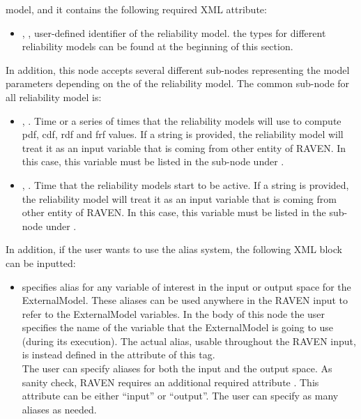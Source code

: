 \begin{itemize}
	model, and it contains the following required XML attribute:
	\begin{itemize}
		\item {}, , user-defined identifier of the reliability model.
		\nb the types for different reliability models can be found at the beginning of this section.
	\end{itemize}
	In addition, this node accepts several different sub-nodes representing the model parameters depending on the
	 of the reliability model. The common sub-node for all reliability model is:
	\begin{itemize}
		\item {}, . Time or a series
		of times that the reliability models will use to compute pdf, cdf, rdf and frf values. If a string is provided,
		the reliability model will treat it as an input variable that is coming from other entity of RAVEN. In this
		case, this variable must be listed in the sub-node  under .
		\item {}, . Time that the reliability models start to be active.
		If a string is provided, the reliability model will treat it as an input variable that is coming
		from other entity of RAVEN. In this case, this variable must be listed in the sub-node 
		under .
	\end{itemize}
\end{itemize}
In addition, if the user wants to use the alias system, the following XML block can be inputted:
\begin{itemize}
	\item {}  specifies alias for
	any variable of interest in the input or output space for the ExternalModel.
	These aliases can be used anywhere in the RAVEN input to refer to the ExternalModel
	variables.
	In the body of this node the user specifies the name of the variable that the ExternalModel is
	going to use (during its execution).
	The actual alias, usable throughout the RAVEN input, is instead defined in the
	 attribute of this tag.
	\\The user can specify aliases for both the input and the output space. As sanity check, RAVEN
	requires an additional required attribute . This attribute can be either ``input'' or ``output''.
	\nb The user can specify as many aliases as needed.
\end{itemize}

